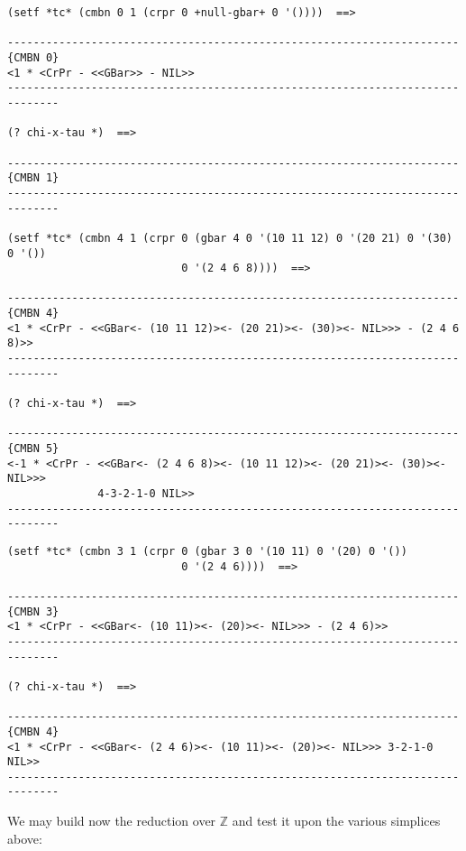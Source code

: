 {\footnotesize\begin{verbatim}
(setf *tc* (cmbn 0 1 (crpr 0 +null-gbar+ 0 '())))  ==>

----------------------------------------------------------------------{CMBN 0}
<1 * <CrPr - <<GBar>> - NIL>>
------------------------------------------------------------------------------

(? chi-x-tau *)  ==>

----------------------------------------------------------------------{CMBN 1}
------------------------------------------------------------------------------

(setf *tc* (cmbn 4 1 (crpr 0 (gbar 4 0 '(10 11 12) 0 '(20 21) 0 '(30) 0 '())
                           0 '(2 4 6 8))))  ==>

----------------------------------------------------------------------{CMBN 4}
<1 * <CrPr - <<GBar<- (10 11 12)><- (20 21)><- (30)><- NIL>>> - (2 4 6 8)>>
------------------------------------------------------------------------------

(? chi-x-tau *)  ==>

----------------------------------------------------------------------{CMBN 5}
<-1 * <CrPr - <<GBar<- (2 4 6 8)><- (10 11 12)><- (20 21)><- (30)><- NIL>>>
              4-3-2-1-0 NIL>>
------------------------------------------------------------------------------
\end{verbatim}}
\newpage
{\footnotesize\begin{verbatim}
(setf *tc* (cmbn 3 1 (crpr 0 (gbar 3 0 '(10 11) 0 '(20) 0 '())
                           0 '(2 4 6))))  ==>

----------------------------------------------------------------------{CMBN 3}
<1 * <CrPr - <<GBar<- (10 11)><- (20)><- NIL>>> - (2 4 6)>>
------------------------------------------------------------------------------

(? chi-x-tau *)  ==>

----------------------------------------------------------------------{CMBN 4}
<1 * <CrPr - <<GBar<- (2 4 6)><- (10 11)><- (20)><- NIL>>> 3-2-1-0 NIL>>
------------------------------------------------------------------------------
\end{verbatim}}
We may build now the reduction over $\mathbb{Z}$ and test it upon the various simplices
above:
